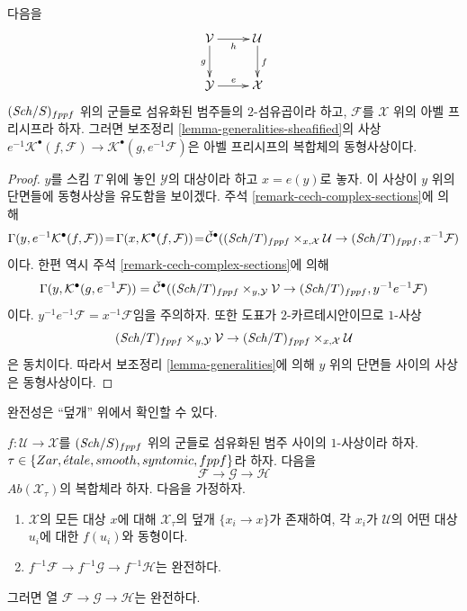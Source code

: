 \begin{lemma}
\label{lemma-base-change-cech-complex}
다음을
$$
\xymatrix{
\mathcal{V} \ar[d]_g \ar[r]_h & \mathcal{U} \ar[d]^f \\
\mathcal{Y} \ar[r]^e & \mathcal{X}
}
$$
$(\mathit{Sch}/S)_{fppf}$ 위의 군들로 섬유화된 범주들의 $2$-섬유곱이라 하고,
$\mathcal{F}$를 $\mathcal{X}$ 위의 아벨 프리시프라 하자. 그러면
보조정리 \ref{lemma-generalities-sheafified}의 사상
$e^{-1}\mathcal{K}^\bullet(f, \mathcal{F}) \to
\mathcal{K}^\bullet(g, e^{-1}\mathcal{F})$은
아벨 프리시프의 복합체의 동형사상이다.
\end{lemma}

\begin{proof}
$y$를 스킴 $T$ 위에 놓인 $\mathcal{Y}$의 대상이라 하고
$x = e(y)$로 놓자. 이 사상이 $y$ 위의 단면들에 동형사상을
유도함을 보이겠다. 주석 \ref{remark-cech-complex-sections}에 의해
$$
\Gamma(y, e^{-1}\mathcal{K}^\bullet(f, \mathcal{F}))\!=\!
\Gamma(x, \mathcal{K}^\bullet(f, \mathcal{F}))\!=\!
\check{\mathcal{C}}^\bullet(
(\mathit{Sch}/T)_{fppf} \times_{x, \mathcal{X}} \mathcal{U} \to
(\mathit{Sch}/T)_{fppf}, x^{-1}\mathcal{F})
$$
이다. 한편 역시 주석 \ref{remark-cech-complex-sections}에 의해
$$
\Gamma(y, \mathcal{K}^\bullet(g, e^{-1}\mathcal{F})) =
\check{\mathcal{C}}^\bullet(
(\mathit{Sch}/T)_{fppf} \times_{y, \mathcal{Y}} \mathcal{V} \to
(\mathit{Sch}/T)_{fppf}, y^{-1}e^{-1}\mathcal{F})
$$
이다. $y^{-1}e^{-1}\mathcal{F} = x^{-1}\mathcal{F}$임을 주의하자.
또한 도표가 $2$-카르테시안이므로 $1$-사상
$$
(\mathit{Sch}/T)_{fppf} \times_{y, \mathcal{Y}} \mathcal{V} \to
(\mathit{Sch}/T)_{fppf} \times_{x, \mathcal{X}} \mathcal{U}
$$
은 동치이다. 따라서 보조정리 \ref{lemma-generalities}에 의해
$y$ 위의 단면들 사이의 사상은 동형사상이다.
\end{proof}

\noindent
완전성은 ``덮개'' 위에서 확인할 수 있다.

\begin{lemma}
\label{lemma-check-exactness-covering}
$f : \mathcal{U} \to \mathcal{X}$를 $(\mathit{Sch}/S)_{fppf}$ 위의
군들로 섬유화된 범주 사이의 $1$-사상이라 하자.
$\tau \in \{Zar, {\acute{e}tale}, smooth, syntomic, fppf\}$라 하자.
다음을
$$
\mathcal{F} \to \mathcal{G} \to \mathcal{H}
$$
$\textit{Ab}(\mathcal{X}_\tau)$의 복합체라 하자. 다음을 가정하자.
\begin{enumerate}
\item $\mathcal{X}$의 모든 대상 $x$에 대해
$\mathcal{X}_\tau$의 덮개 $\{x_i \to x\}$가 존재하여,
각 $x_i$가 $\mathcal{U}$의 어떤 대상 $u_i$에 대한
$f(u_i)$와 동형이다.
\item $f^{-1}\mathcal{F} \to f^{-1}\mathcal{G} \to f^{-1}\mathcal{H}$는 완전하다.
\end{enumerate}
그러면 열 $\mathcal{F} \to \mathcal{G} \to \mathcal{H}$는 완전하다.
\end{lemma}

